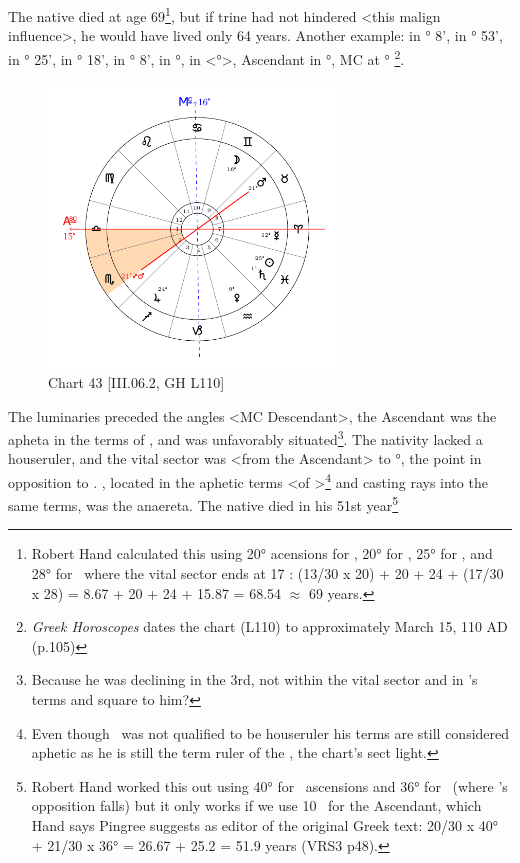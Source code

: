 \newpage
The native died at age 69\footnote{Robert Hand calculated this using 20° acensions for \Pisces,  20° for \Aries, 25° for \Taurus, and 28° for \Gemini\, where the vital sector ends at 17 \Gemini: (13/30 x 20) + 20 + 24 + (17/30 x 28) = 8.67 + 20 + 24 + 15.87 = 68.54 $\approx$ 69 years.}, but if \Jupiter\xspace trine had not hindered <this malign influence>, he would have lived only 64 years.
\newpage
Another example: \Sun\xspace in \Pisces\xspace 25° 8', \Moon\xspace in \Gemini\xspace 16° 53', \Saturn\xspace in \Pisces\xspace 1° 25', \Jupiter\xspace in
\Sagittarius\xspace 24° 18', \Mars\xspace in \Taurus\xspace 21° 8', \Venus\xspace in \Aquarius\xspace 9°, \Mercury\xspace in <°>, Ascendant in \Libra\xspace 15°, MC at \Cancer\xspace 16°
\footnote{\textit{Greek Horoscopes} dates the chart (L110) to approximately March 15, 110 AD (p.105)}.  

\clearpage
\begin{figure}
\centering
\vspace{-20pt}
\includegraphics[width=0.68\textwidth]{charts/3_06_2}
\caption{Chart 43 [III.06.2, GH L110]}
\label{fig:chart43}
\end{figure} 

The luminaries preceded the angles <MC Descendant>, the Ascendant was the apheta in the terms of \Jupiter, and \Jupiter\xspace was unfavorably situated\footnote{Because he was declining in the 3rd, not within the vital sector and in \Saturn's terms and square to him?}. The nativity lacked a houseruler, and the vital sector was <from the Ascendant> to \Scorpio\xspace 21°, the point in opposition to \Mars. \Mars, located in the aphetic terms <of \Jupiter>\footnote{Even though \Jupiter\, was not qualified to be houseruler his terms are still considered aphetic as he is still the term ruler of the \Moon, the chart's sect light.} and casting rays into the same terms, was the anaereta. The native died in his 51st year\footnote{Robert Hand worked this out using 40° for \Libra\, ascensions and 36° for \Scorpio\, (where \Mars's opposition falls) but it only works if we use 10 \Libra\, for the Ascendant, which Hand says Pingree suggests as editor of the original Greek text: 20/30 x 40° + 21/30 x 36° = 26.67 + 25.2 = 51.9 years (VRS3 p48).}

